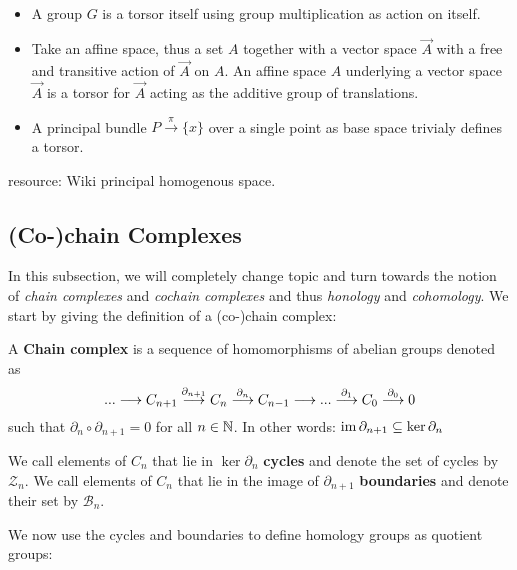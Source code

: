 \begin{example}~
\begin{itemize}
  \item A group $G$ is a torsor itself using group multiplication as action on itself.

  \item Take an affine space, thus a set $A$ together with a vector space $\vec{A}$ with a free and transitive action of $\vec{A}$ on $A$. An affine space $A$ underlying a vector space $\vec{A}$ is a torsor for $\vec{A}$ acting as the additive group of translations.

  \item A principal bundle $P \overset{\pi}{\longrightarrow} \{x\}$ over a single point as base space trivialy defines a torsor.
\end{itemize}
\end{example}

resource: Wiki principal homogenous space.

\subsection{(Co-)chain Complexes}

In this subsection, we will completely change topic and turn towards the notion of \emph{chain complexes} and \emph{cochain complexes} and thus \emph{honology} and \emph{cohomology}. We start by giving the definition of a (co-)chain complex:

\begin{definition}
  A \textbf{Chain complex} is a sequence of homomorphisms of abelian groups denoted as
  $$ ... \longrightarrow C_{n+1} \overset{\partial_{n+1}}{\longrightarrow} C_{n} \overset{\partial_{n}}{\longrightarrow} C_{n-1} \longrightarrow ... \overset{\partial_{1}}{\longrightarrow} C_{0} \overset{\partial_{0}}{\longrightarrow} 0$$
  such that $\partial_n \circ \partial_{n+1} = 0$ for all $n \in \mathbb{N}$. In other words: $\operatorname{im} \partial_{n+1} \subseteq \ker \partial_n$
\end{definition}

\begin{definition}
  We call elements of $C_n$ that lie in $\ker \partial_n$ \textbf{cycles} and denote the set of cycles by $\mathcal{Z}_n$. We call elements of $C_n$ that lie in the image of $\partial_{n+1}$ \textbf{boundaries} and denote their set by $\mathcal{B}_n$.
\end{definition}

We now use the cycles and boundaries to define homology groups as quotient groups:

